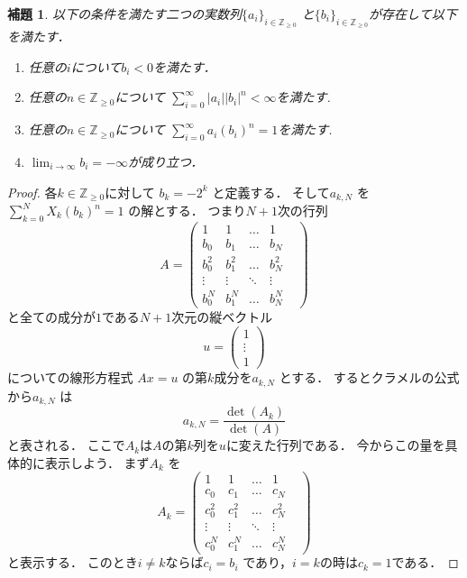 \documentclass[leqno, a4paper, 12pt]{jsarticle}
\newtheorem{lem}[thm]{補題}
\newcommand{\zz}{\mathbb{Z}}
\begin{document}
\begin{lem}\label{lem:seq}
以下の条件を満たす二つの実数列$\{a_{i}\}_{i\in \zz_{\ge 0}}$
と$\{b_{i}\}_{i\in \zz_{\ge 0}}$が存在して以下を満たす．
\begin{enumerate}
\item 
任意の$i$について$b_{i}<0$を満たす．
\item 
任意の$n\in  \zz_{\ge 0}$について
$\sum_{i=0}^{\infty}|a_{i}||b_{i}|^n<\infty$を満たす. 
\item 
任意の$n\in \zz_{\ge 0}$について
$\sum_{i=0}^{\infty}a_{i}(b_{i})^n=1$を満たす. 
\item 
$\lim_{i\to \infty}b_{i}=-\infty$が成り立つ．
\end{enumerate}

\end{lem}
\begin{proof}
各$k\in \zz_{\ge 0}$に対して
$b_{k}=-2^{k}$
と定義する．
そして$a_{k, N}$
を
$\sum_{k=0}^{N}X_{k}(b_{k})^{n}=1$
の解とする．
つまり$N+1$次の行列
\[
A=
\begin{pmatrix}
1 & 1 &  \dots & 1\\
b_{0} & b_{1} &  \dots & b_{N}\\
b_{0}^{2} & b_{1}^{2} &  \dots & b_{N}^{2}\\
\vdots & \vdots  &  \ddots & \vdots &\\
b_{0}^{N} & b_{1}^{N} &  \dots & b_{N}^{N}
\end{pmatrix}
\]
と全ての成分が$1$である$N+1$次元の縦ベクトル
\[
u=
\begin{pmatrix}
1\\
\vdots\\
1
\end{pmatrix}
\]
についての線形方程式
$Ax=u$
の第$k$成分を$a_{k, N}$
とする．
するとクラメルの公式から$a_{k, N}$
は
\[
a_{k, N}
=
\frac{\det(A_{k})}{\det(A)}
\]
と表される．
ここで$A_{k}$は$A$の第$k$列を$u$に変えた行列である．
今からこの量を具体的に表示しよう．
まず$A_{k}$
を
\[
A_{k}=
\begin{pmatrix}
1 & 1 &  \dots & 1\\
c_{0} & c_{1} &  \dots & c_{N}\\
c_{0}^{2} & c_{1}^{2} &  \dots & c_{N}^{2}\\
\vdots & \vdots  &  \ddots & \vdots &\\
c_{0}^{N} & c_{1}^{N} &  \dots & c_{N}^{N}
\end{pmatrix}
\]
と表示する．
このとき$i\neq k$ならば$c_{i}=b_{i}$
であり，$i=k$の時は$c_{k}=1$である．


\end{proof}
\end{document}
